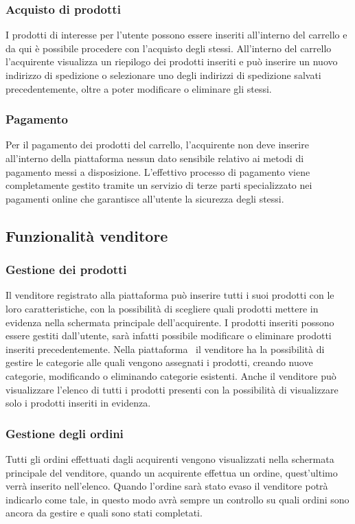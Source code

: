 \subsubsection*{Acquisto di prodotti}
I prodotti di interesse per l'utente possono essere inseriti all'interno del carrello e da qui è possibile procedere con l'acquisto degli stessi. All'interno del carrello l'acquirente visualizza un riepilogo dei prodotti inseriti e può inserire un nuovo indirizzo di spedizione o selezionare uno degli indirizzi di spedizione salvati precedentemente, oltre a poter modificare o eliminare gli stessi. 
\subsubsection*{Pagamento}
Per il pagamento dei prodotti del carrello, l'acquirente non deve inserire all'interno della piattaforma nessun dato sensibile relativo ai metodi di pagamento messi a disposizione. L'effettivo processo di pagamento viene completamente gestito tramite un servizio di terze parti specializzato nei pagamenti online che garantisce all'utente la sicurezza degli stessi.
\subsection{Funzionalità venditore}\label{FunzionalitàVend}
\subsubsection*{Gestione dei prodotti}
Il venditore registrato alla piattaforma può inserire tutti i suoi prodotti con le loro caratteristiche, con la possibilità di scegliere quali prodotti mettere in evidenza nella schermata principale dell'acquirente. I prodotti inseriti possono essere gestiti dall'utente, sarà infatti possibile modificare o eliminare prodotti inseriti precedentemente. Nella piattaforma \NomeProgetto\ il venditore ha la possibilità di gestire le categorie alle quali vengono assegnati i prodotti, creando nuove categorie, modificando o eliminando categorie esistenti. Anche il venditore può visualizzare l'elenco di tutti i prodotti presenti con la possibilità di visualizzare solo i prodotti inseriti in evidenza.
\subsubsection*{Gestione degli ordini}
Tutti gli ordini effettuati dagli acquirenti vengono visualizzati nella schermata principale del venditore, quando un acquirente effettua un ordine, quest'ultimo verrà inserito nell'elenco. Quando l'ordine sarà stato evaso il venditore potrà indicarlo come tale, in questo modo avrà sempre un controllo su quali ordini sono ancora da gestire e quali sono stati completati.